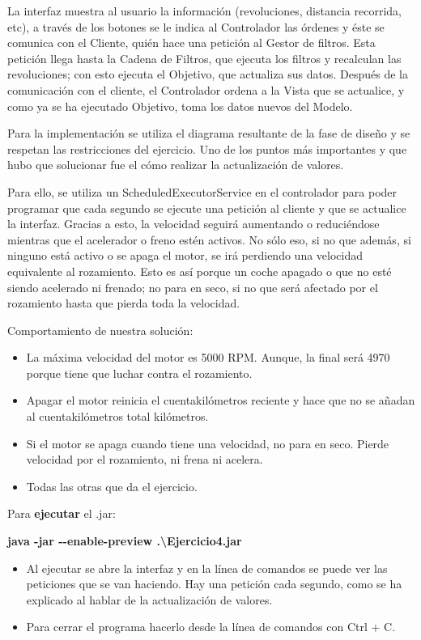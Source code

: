 \documentclass[
]{article}
\begin{document}
La interfaz muestra al usuario la información (revoluciones, distancia
recorrida, etc), a través de los botones se le indica al Controlador las
órdenes y éste se comunica con el Cliente, quién hace una petición al
Gestor de filtros. Esta petición llega hasta la Cadena de Filtros, que
ejecuta los filtros y recalculan las revoluciones; con esto ejecuta el
Objetivo, que actualiza sus datos. Después de la comunicación con el
cliente, el Controlador ordena a la Vista que se actualice, y como ya se
ha ejecutado Objetivo, toma los datos nuevos del Modelo.

Para la implementación se utiliza el diagrama resultante de la fase de
diseño y se respetan las restricciones del ejercicio. Uno de los puntos
más importantes y que hubo que solucionar fue el cómo realizar la
actualización de valores.

Para ello, se utiliza un ScheduledExecutorService en el controlador para
poder programar que cada segundo se ejecute una petición al cliente y
que se actualice la interfaz. Gracias a esto, la velocidad seguirá
aumentando o reduciéndose mientras que el acelerador o freno estén
activos. No sólo eso, si no que además, si ninguno está activo o se
apaga el motor, se irá perdiendo una velocidad equivalente al
rozamiento. Esto es así porque un coche apagado o que no esté siendo
acelerado ni frenado; no para en seco, si no que será afectado por el
rozamiento hasta que pierda toda la velocidad.

Comportamiento de nuestra solución:

\begin{itemize}
\item
  La máxima velocidad del motor es 5000 RPM. Aunque, la final será 4970
  porque tiene que luchar contra el rozamiento.
\item
  Apagar el motor reinicia el cuentakilómetros reciente y hace que no se
  añadan al cuentakilómetros total kilómetros.
\item
  Si el motor se apaga cuando tiene una velocidad, no para en seco.
  Pierde velocidad por el rozamiento, ni frena ni acelera.
\item
  Todas las otras que da el ejercicio.
\end{itemize}

Para \textbf{ejecutar} el .jar:

\textbf{java -jar -\/-enable-preview .\textbackslash Ejercicio4.jar}

\begin{itemize}
\item
  Al ejecutar se abre la interfaz y en la línea de comandos se puede ver
  las peticiones que se van haciendo. Hay una petición cada segundo,
  como se ha explicado al hablar de la actualización de valores.
\item
  Para cerrar el programa hacerlo desde la línea de comandos con Ctrl +
  C.
\end{itemize}
\end{document}
